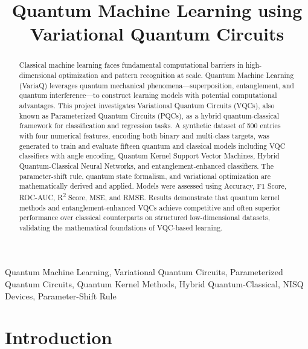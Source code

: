 \documentclass[conference]{IEEEtran}
\begin{document}
\title{Quantum Machine Learning using Variational Quantum Circuits}

\author{
}

\maketitle

\begin{abstract}
Classical machine learning faces fundamental computational barriers in high-dimensional optimization and pattern recognition at scale. Quantum Machine Learning (VariaQ) leverages quantum mechanical phenomena---superposition, entanglement, and quantum interference---to construct learning models with potential computational advantages. This project investigates Variational Quantum Circuits (VQCs), also known as Parameterized Quantum Circuits (PQCs), as a hybrid quantum-classical framework for classification and regression tasks. A synthetic dataset of 500 entries with four numerical features, encoding both binary and multi-class targets, was generated to train and evaluate fifteen quantum and classical models including VQC classifiers with angle encoding, Quantum Kernel Support Vector Machines, Hybrid Quantum-Classical Neural Networks, and entanglement-enhanced classifiers. The parameter-shift rule, quantum state formalism, and variational optimization are mathematically derived and applied. Models were assessed using Accuracy, F1 Score, ROC-AUC, R\textsuperscript{2} Score, MSE, and RMSE. Results demonstrate that quantum kernel methods and entanglement-enhanced VQCs achieve competitive and often superior performance over classical counterparts on structured low-dimensional datasets, validating the mathematical foundations of VQC-based learning.
\end{abstract}

\begin{IEEEkeywords}
Quantum Machine Learning, Variational Quantum Circuits, Parameterized Quantum Circuits, Quantum Kernel Methods, Hybrid Quantum-Classical, NISQ Devices, Parameter-Shift Rule
\end{IEEEkeywords}

\section{Introduction}
\end{document}
